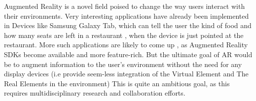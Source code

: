 Augmented Reality is a novel field poised to change the way users 
interact with their environments. Very interesting applications 
have already been implemented in Devices like Samsung Galaxy Tab, which can
tell the user the kind of food and how many seats are left in a restaurant
, when the device is just pointed at the restaurant.
More such applications are likely to come up , as Augmented Reality SDKs
become available and more feature-rich.
But the ultimate goal of AR would be to augment information to the user's
environment without the need for any display devices (i.e provide seem-less
integration of the Virtual Element and The Real Elements in the environment)
This is quite an ambitious goal, as this requires multidisciplinary research
and collaboration efforts.
